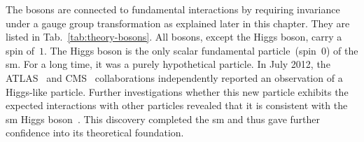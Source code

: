 

The bosons are connected to fundamental interactions by requiring invariance under a gauge group transformation as explained later in this chapter. They are listed in Tab.~\ref{tab:theory-bosons}. All bosons, except the Higgs boson, carry a spin of~$1$. The Higgs boson is the only scalar fundamental particle~(spin~$0$) of the \gls{sm}. For a long time, it was a purely hypothetical particle. In July 2012, the ATLAS~\cite{Aad:2012tfa} and CMS~\cite{Chatrchyan:2012xdj} collaborations independently reported an observation of a Higgs-like particle. Further investigations whether this new particle exhibits the expected interactions with other particles revealed that it is consistent with the \gls{sm} Higgs boson~\cite{Khachatryan:2016vau}. This discovery completed the \gls{sm} and thus gave further confidence into its theoretical foundation.



